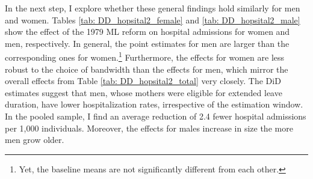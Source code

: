 \documentclass[11pt, a4paper, draft]{article} %
\newcommand\natalia[1]{\textcolor{orange}{#1}}
\begin{document}






 

In the next step, I explore whether these general findings hold similarly for men and women. Tables \ref{tab: DD_hopsital2_female} and \ref{tab: DD_hopsital2_male} show the effect of the 1979 ML reform on hospital admissions for women and men, respectively. In general, the point estimates for men are larger than the corresponding ones for women.\footnote{Yet, the baseline means are not significantly different from each other.} Furthermore, the effects for women are less robust to the choice of bandwidth than the effects for men, which mirror the overall effects from Table \ref{tab: DD_hopsital2_total} very closely. The DiD estimates suggest that men, whose mothers were eligible for extended leave duration, have lower hospitalization rates, irrespective of the estimation window. In the pooled sample, I find an average reduction of 2.4 fewer hospital admissions per 1,000 individuals. Moreover, the effects for males increase in size the more men grow older. 
\end{document}

